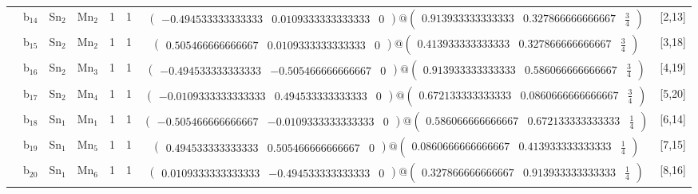 \documentclass[fleqn,10pt,landscape]{article}
\begin{document}
\begin{itemize}
\begin{center}
\begin{longtable}{cc|cc|c|c|c|l}
& b$_{14}$ & Sn$_{2}$ & Mn$_{2}$ & 1 & 1 & $\begin{pmatrix} -0.494533333333333 & 0.0109333333333333 & 0 \end{pmatrix}@\begin{pmatrix} 0.913933333333333 & 0.327866666666667 & \frac{3}{4} \end{pmatrix}$ & [2,13] \\
& b$_{15}$ & Sn$_{2}$ & Mn$_{2}$ & 1 & 1 & $\begin{pmatrix} 0.505466666666667 & 0.0109333333333333 & 0 \end{pmatrix}@\begin{pmatrix} 0.413933333333333 & 0.327866666666667 & \frac{3}{4} \end{pmatrix}$ & [3,18] \\
& b$_{16}$ & Sn$_{2}$ & Mn$_{3}$ & 1 & 1 & $\begin{pmatrix} -0.494533333333333 & -0.505466666666667 & 0 \end{pmatrix}@\begin{pmatrix} 0.913933333333333 & 0.586066666666667 & \frac{3}{4} \end{pmatrix}$ & [4,19] \\
& b$_{17}$ & Sn$_{2}$ & Mn$_{4}$ & 1 & 1 & $\begin{pmatrix} -0.0109333333333333 & 0.494533333333333 & 0 \end{pmatrix}@\begin{pmatrix} 0.672133333333333 & 0.0860666666666667 & \frac{3}{4} \end{pmatrix}$ & [5,20] \\
& b$_{18}$ & Sn$_{1}$ & Mn$_{1}$ & 1 & 1 & $\begin{pmatrix} -0.505466666666667 & -0.0109333333333333 & 0 \end{pmatrix}@\begin{pmatrix} 0.586066666666667 & 0.672133333333333 & \frac{1}{4} \end{pmatrix}$ & [6,14] \\
& b$_{19}$ & Sn$_{1}$ & Mn$_{5}$ & 1 & 1 & $\begin{pmatrix} 0.494533333333333 & 0.505466666666667 & 0 \end{pmatrix}@\begin{pmatrix} 0.0860666666666667 & 0.413933333333333 & \frac{1}{4} \end{pmatrix}$ & [7,15] \\
& b$_{20}$ & Sn$_{1}$ & Mn$_{6}$ & 1 & 1 & $\begin{pmatrix} 0.0109333333333333 & -0.494533333333333 & 0 \end{pmatrix}@\begin{pmatrix} 0.327866666666667 & 0.913933333333333 & \frac{1}{4} \end{pmatrix}$ & [8,16] \\

\end{longtable}
\end{center}
\end{itemize}
\end{document}
